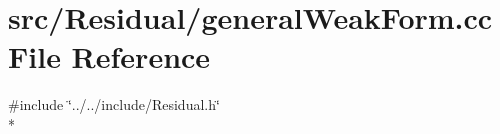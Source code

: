 \section{src/\-Residual/general\-Weak\-Form.cc File Reference}
\label{general_weak_form_8cc}
{\ttfamily \#include \char`\"{}../../include/\-Residual.\-h\char`\"{}}\\*
